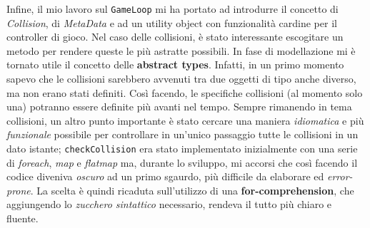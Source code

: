 

Infine, il mio lavoro sul \texttt{GameLoop} mi ha portato ad introdurre il concetto di \textit{Collision}, di \textit{MetaData} e ad un utility object con funzionalità cardine per il controller di gioco. Nel caso delle collisioni, è stato interessante escogitare un metodo per rendere queste le più astratte possibili. In fase di modellazione mi è tornato utile il concetto delle \textbf{abstract types}. Infatti, in un primo momento sapevo che le collisioni sarebbero avvenuti tra due oggetti di tipo anche diverso, ma non erano stati definiti. Così facendo, le specifiche collisioni (al momento solo una) potranno essere definite più avanti nel tempo. Sempre rimanendo in tema collisioni, un altro punto importante è stato cercare una maniera \textit{idiomatica} e più \textit{funzionale} possibile per controllare in un'unico passaggio tutte le collisioni in un dato istante; \texttt{checkCollision} era stato implementato inizialmente con una serie di \textit{foreach}, \textit{map} e \textit{flatmap} ma, durante lo sviluppo, mi accorsi che così facendo il codice diveniva \textit{oscuro} ad un primo sgaurdo, più difficile da elaborare ed \textit{error-prone}. La scelta è quindi ricaduta sull'utilizzo di una \textbf{for-comprehension}, che aggiungendo lo \textit{zucchero sintattico} necessario, rendeva il tutto più chiaro e fluente.



